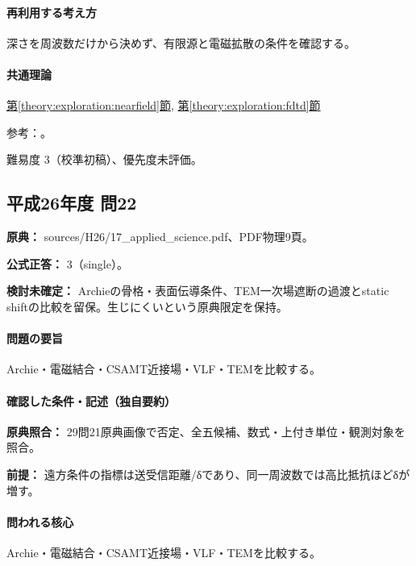 \paragraph{再利用する考え方} 深さを周波数だけから決めず、有限源と電磁拡散の条件を確認する。

\paragraph{共通理論} \hyperref[theory:exploration:nearfield]{第\ref*{theory:exploration:nearfield}節}, \hyperref[theory:exploration:fdtd]{第\ref*{theory:exploration:fdtd}節}

\par 参考：\cite{usgs_csamt2012,epa_tdem_archive,epa_fdem,usgs_mt_metadata}。

\par 難易度 3（校準初稿）、優先度未評価。

\subsection{平成26年度 問22}
\label{q:h26-reg-applied-22}

\noindent\textbf{原典：} sources/H26/17\_applied\_science.pdf、PDF物理9頁。

\textbf{公式正答：} 3（single）。

\par\textbf{検討未確定：} Archieの骨格・表面伝導条件、TEM一次場遮断の過渡とstatic shiftの比較を留保。生じにくいという原典限定を保持。

\paragraph{問題の要旨} Archie・電磁結合・CSAMT近接場・VLF・TEMを比較する。

\paragraph{確認した条件・記述（独自要約）}\mbox{}\par

\noindent\textbf{原典照合：} 29問21原典画像で否定、全五候補、数式・上付き単位・観測対象を照合。\par

\noindent\textbf{前提：} 遠方条件の指標は送受信距離/δであり、同一周波数では高比抵抗ほどδが増す。\par

\paragraph{問われる核心} Archie・電磁結合・CSAMT近接場・VLF・TEMを比較する。

